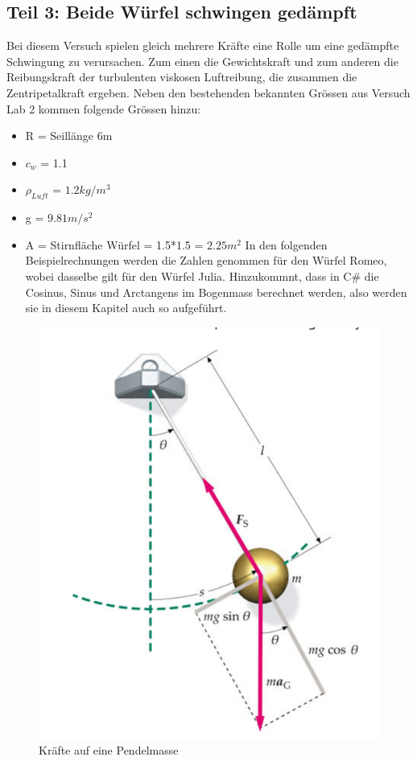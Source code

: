 \documentclass[../main.tex]{subfiles}
\begin{document}
\subsection{Teil 3: Beide Würfel schwingen gedämpft}
Bei diesem Versuch spielen gleich mehrere Kräfte eine Rolle um eine gedämpfte Schwingung zu verursachen. Zum einen die Gewichtskraft und zum anderen die Reibungskraft der turbulenten viskosen Luftreibung, die zusammen die Zentripetalkraft ergeben.
Neben den bestehenden bekannten Grössen aus Versuch Lab 2 kommen folgende Grössen hinzu:
\begin{itemize}
	\item R = Seillänge 6m
	\item $c_w$ = 1.1
	\item $\rho_{Luft}$ = $1.2kg/m^3$
	\item g = $9.81 m/s^2$
	\item A = Stirnfläche Würfel = 1.5*1.5 = $2.25m^2$
In den folgenden Beispielrechnungen werden die Zahlen genommen für den Würfel Romeo, wobei dasselbe gilt für den Würfel Julia. 	Hinzukommnt, dass in C\# die Cosinus, Sinus und Arctangens im Bogenmass berechnet werden, also werden sie in diesem Kapitel auch so aufgeführt.
\end{itemize}
     \begin{figure}[H]
               \begin{center}
                   \centerline{\includegraphics[width=155mm]{./images/Lab3Unity/KraeftePendel.png}}
                   \caption{Kräfte auf eine Pendelmasse \cite{tiplerpaula.PhysikFurStudierende}}
                   \label{fig:Pendel}
               \end{center}
     \end{figure}
\end{document}
